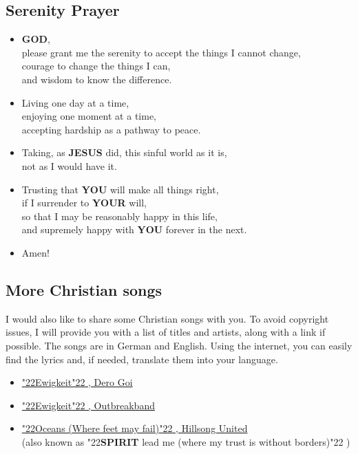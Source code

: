 \documentclass[10pt,a5paper]{article}
\newcommand{\God}[0]{\textbf{GOD}}
\newcommand{\Jesus}[0]{\textbf{JESUS}}
\newcommand{\Spirit}[0]{\textbf{SPIRIT}}
\newcommand{\You}[0]{\textbf{YOU}}
\newcommand{\Your}[0]{\textbf{YOUR}}
\newcommand{\q}[1]{\char"22{#1}\char"22 }
\begin{document}
	\subsection{Serenity Prayer}
		\begin{itemize}[nosep]
			\item	{\God},
			\\		please grant me the serenity to accept the things I cannot change,
			\\		courage to change the things I can,
			\\		and wisdom to know the difference.
			\item	Living one day at a time,
			\\		enjoying one moment at a time,
			\\		accepting hardship as a pathway to peace.
			\item	Taking,
					as {\Jesus} did,
					this sinful world as it is,
			\\		not as I would have it.
			\item	Trusting that {\You} will make all things right,
			\\		if I surrender to {\Your} will,
			\\		so that I may be reasonably happy in this life,
			\\		and supremely happy with {\You} forever in the next.
			\item	Amen!
		\end{itemize}
		 
	\subsection{More Christian songs}
		I would also like to share some Christian songs with you.
		To avoid copyright issues,
		I will provide you with a list of titles and artists,
		along with a link if possible.
		The songs are in German and English.
		Using the internet,
		you can easily find the lyrics and,
		if needed,
		translate them into your language.
		\begin{itemize}[noitemsep]
			\item	\href{https://www.youtube.com/watch?v=Oncj9JBo1xQ}{\q{Ewigkeit},
					Dero Goi}
			\item	\href{https://www.youtube.com/watch?v=PcxaUHkmnSQ}{\q{Ewigkeit},
					Outbreakband}
			\item	\href{https://www.youtube.com/watch?v=DqlpyrHB_Qk}{\q{Oceans (Where feet may fail)},
					Hillsong United}
					\\
					(also known as \q{{\Spirit} lead me (where my trust is without borders)})
		\end{itemize}
				
\end{document}
